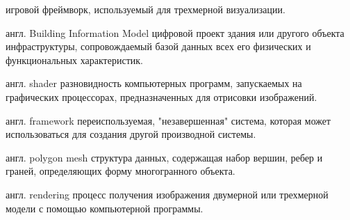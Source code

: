 ﻿

\begin{rglossary}
    {игровой фреймворк, используемый для трехмерной визуализации.%
    \cite{DocUnity}}

    {англ. Building Information Model}
    {цифровой проект здания или другого объекта инфраструктуры,
    сопровождаемый базой данных всех его физических и функциональных характеристик.%
    \cite{NationalBIMfaqs}}

    {англ. shader}
    {разновидность компьютерных программ, запускаемых на графических процессорах,
    предназначенных для отрисовки изображений.}

    {англ. framework}
    {переиспользуемая, "незавершенная" система,
    которая может использоваться для создания другой производной системы.%
    \cite{Johnson1988,Schmidt2000}}

    {англ. polygon mesh}
    {структура данных, содержащая набор вершин, ребер и граней,
    определяющих форму многогранного объекта.}

    {англ. rendering}
    {процесс получения изображения двумерной или трехмерной модели
    с помощью компьютерной программы.}
\end{rglossary}